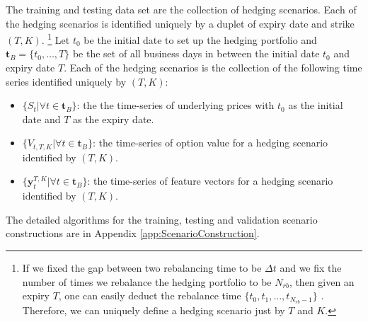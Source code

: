 \documentclass[letterpaper,12pt,titlepage,oneside,final]{book}
\numberwithin{equation}{section}
\theoremstyle{definition}
\newcommand{\vy}{\mathbf{y}}
\newcommand{\DT}{\Delta t}
\begin{document}
The training and testing data set are the collection of hedging scenarios. Each of the hedging scenarios is identified uniquely by a duplet of expiry date and strike  $(T,K)$. \footnote{ If we fixed the gap between two rebalancing time to be $\DT$ and we fix the number of times we rebalance the hedging portfolio to be $N_{rb}$, then given an expiry $T$, one can easily deduct the rebalance time $\{t_0,t_1, \dots, t_{N_{rb}-1}\}$ . Therefore, we can uniquely define a hedging scenario just by $T$ and $K$.} Let $t_0$ be the initial date to set up the hedging portfolio and $\mathbf{t}_B=\{t_0,\dots,T\}$ be the set of all business days in between the initial date $t_0$ and expiry date $T$.  Each of the hedging scenarios is the collection of the following time series identified uniquely by $(T,K)$:
\begin{itemize}
	\item $\{S_t|\forall t \in \mathbf{t}_B \}$: the the time-series of underlying prices  with $t_0$ as the initial date and $T$ as the expiry date.
	\item $\{V_{t,T,K}|\forall t \in \mathbf{t}_B\}$:  the time-series of option value for a hedging scenario identified by $(T,K)$.
	\item $\{\vy^{T,K}_{t}|\forall t \in \mathbf{t}_B\}$: the time-series of feature vectors for a hedging scenario identified by $(T,K)$.
\end{itemize}
The detailed algorithms for the training, testing and validation scenario constructions are in Appendix \ref{app:ScenarioConstruction}. 
\end{document}
